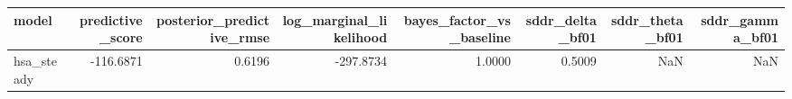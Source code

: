 \begin{tabular}{lrrrrrrr}
\toprule
model & predictive\_score & posterior\_predictive\_rmse & log\_marginal\_likelihood & bayes\_factor\_vs\_baseline & sddr\_delta\_bf01 & sddr\_theta\_bf01 & sddr\_gamma\_bf01 \\
\midrule
hsa\_steady & -116.6871 & 0.6196 & -297.8734 & 1.0000 & 0.5009 & NaN & NaN \\
\bottomrule
\end{tabular}
